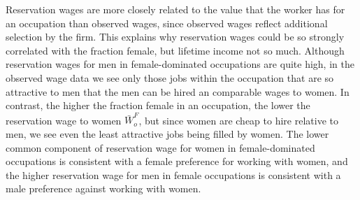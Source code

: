 \documentclass[11pt]{article}
\begin{document}




Reservation wages are more closely related to the value that the worker has for an occupation than observed wages, since observed wages reflect additional selection by the firm. This explains why reservation wages could be so strongly correlated with the fraction female, but lifetime income not so much. Although reservation wages for men in female-dominated occupations are quite high, in the observed wage data we see only those jobs within the occupation that are so attractive to men that the men can be hired an comparable wages to women. In contrast, the higher the fraction female in an occupation, the lower the reservation wage to women $\bar{W}^F_o$, but since women are cheap to hire relative to men, we see even the least attractive jobs being filled by women. The lower common component of reservation wage for women in female-dominated occupations is consistent with a female preference for working with women, and the higher reservation wage for men in female occupations is consistent with a male preference against working with women.











\end{document}

